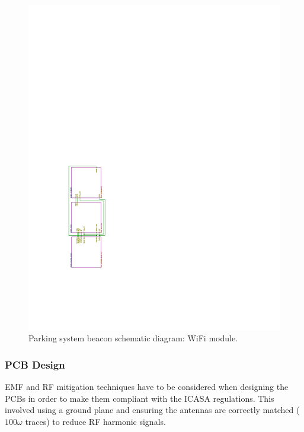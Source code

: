 \begin{figure}[H]
\begin{center}
\includegraphics[page=4,scale=1,trim={5cm 9cm 10cm 13cm},clip,angle=-90]{data/parking-system2.pdf}
\caption{Parking system beacon schematic diagram: WiFi module.}
\end{center}
\end{figure}

\newpage
\subsubsection{PCB Design}

EMF and RF mitigation techniques have to be considered when designing the PCBs in order to make them compliant with the ICASA regulations. This involved using a ground plane and ensuring the antennas are correctly matched ($100\omega$ traces) to reduce RF harmonic signals.

